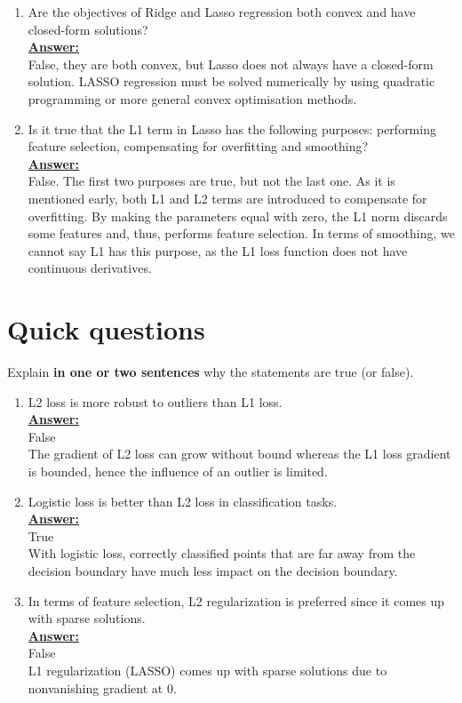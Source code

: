 \documentclass{article}
\newenvironment{qparts}{\begin{enumerate}[1.]}{\end{enumerate}}
\begin{document}
\begin{qparts}
\item Are the objectives of Ridge and Lasso regression both convex and have closed-form solutions?\\
\underline{\textbf{Answer:}}\\
False, they are both convex, but Lasso does not always have a closed-form solution. LASSO regression must be solved numerically by using quadratic programming or more general convex optimisation methods.

\item Is it true that the L1 term in Lasso has the following purposes: performing feature selection, compensating for overfitting and smoothing?\\
\underline{\textbf{Answer:}}\\
False. The first two purposes are true, but not the last one. As it is mentioned early, both L1 and L2 terms are introduced to compensate for overfitting. By making the parameters equal with zero, the L1 norm discards some features and, thus, performs feature selection. In terms of smoothing, we cannot say L1 has this purpose, as the L1 loss function does not have continuous derivatives.
\end{qparts}


\newpage
\section{Quick questions}
Explain \textbf{in one or two sentences} why the statements are true (or false).
\begin{qparts}
\item L2 loss is more robust to outliers than L1 loss.\\
\underline{\textbf{Answer:}}\\
False \\
The gradient of L2 loss can grow without bound whereas the L1 loss gradient is bounded, hence the influence of an outlier is limited.

\item Logistic loss is better than L2 loss in classification tasks.\\
\underline{\textbf{Answer:}}\\
True \\ 
With logistic loss, correctly classified points that are far away from the decision boundary have much less impact on the decision boundary.


\item In terms of feature selection, L2 regularization is preferred since it comes up with sparse solutions.\\
\underline{\textbf{Answer:}}\\
False \\
L1 regularization (LASSO) comes up with sparse solutions due to nonvanishing gradient at 0.
\end{qparts}
\end{document}
